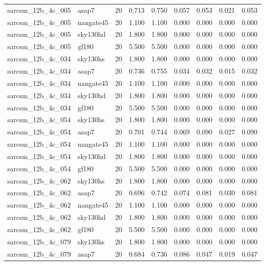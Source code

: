\begin{tabular}{llrrrrrrr}
sarcsm\_12b\_4c\_005 & asap7 & 20 & 0.713 & 0.750 & 0.057 & 0.053 & 0.021 & 0.053 \\
sarcsm\_12b\_4c\_005 & nangate45 & 20 & 1.100 & 1.100 & 0.000 & 0.000 & 0.000 & 0.000 \\
sarcsm\_12b\_4c\_005 & sky130hd & 20 & 1.800 & 1.800 & 0.000 & 0.000 & 0.000 & 0.000 \\
sarcsm\_12b\_4c\_005 & gf180 & 20 & 5.500 & 5.500 & 0.000 & 0.000 & 0.000 & 0.000 \\
sarcsm\_12b\_4c\_034 & sky130hs & 20 & 1.800 & 1.800 & 0.000 & 0.000 & 0.000 & 0.000 \\
sarcsm\_12b\_4c\_034 & asap7 & 20 & 0.736 & 0.755 & 0.034 & 0.032 & 0.015 & 0.032 \\
sarcsm\_12b\_4c\_034 & nangate45 & 20 & 1.100 & 1.100 & 0.000 & 0.000 & 0.000 & 0.000 \\
sarcsm\_12b\_4c\_034 & sky130hd & 20 & 1.800 & 1.800 & 0.000 & 0.000 & 0.000 & 0.000 \\
sarcsm\_12b\_4c\_034 & gf180 & 20 & 5.500 & 5.500 & 0.000 & 0.000 & 0.000 & 0.000 \\
sarcsm\_12b\_4c\_054 & sky130hs & 20 & 1.800 & 1.800 & 0.000 & 0.000 & 0.000 & 0.000 \\
sarcsm\_12b\_4c\_054 & asap7 & 20 & 0.701 & 0.744 & 0.069 & 0.090 & 0.027 & 0.090 \\
sarcsm\_12b\_4c\_054 & nangate45 & 20 & 1.100 & 1.100 & 0.000 & 0.000 & 0.000 & 0.000 \\
sarcsm\_12b\_4c\_054 & sky130hd & 20 & 1.800 & 1.800 & 0.000 & 0.000 & 0.000 & 0.000 \\
sarcsm\_12b\_4c\_054 & gf180 & 20 & 5.500 & 5.500 & 0.000 & 0.000 & 0.000 & 0.000 \\
sarcsm\_12b\_4c\_062 & sky130hs & 20 & 1.800 & 1.800 & 0.000 & 0.000 & 0.000 & 0.000 \\
sarcsm\_12b\_4c\_062 & asap7 & 20 & 0.696 & 0.742 & 0.074 & 0.081 & 0.030 & 0.081 \\
sarcsm\_12b\_4c\_062 & nangate45 & 20 & 1.100 & 1.100 & 0.000 & 0.000 & 0.000 & 0.000 \\
sarcsm\_12b\_4c\_062 & sky130hd & 20 & 1.800 & 1.800 & 0.000 & 0.000 & 0.000 & 0.000 \\
sarcsm\_12b\_4c\_062 & gf180 & 20 & 5.500 & 5.500 & 0.000 & 0.000 & 0.000 & 0.000 \\
sarcsm\_12b\_4c\_079 & sky130hs & 20 & 1.800 & 1.800 & 0.000 & 0.000 & 0.000 & 0.000 \\
sarcsm\_12b\_4c\_079 & asap7 & 20 & 0.684 & 0.736 & 0.086 & 0.047 & 0.019 & 0.047 \\

\end{tabular}
